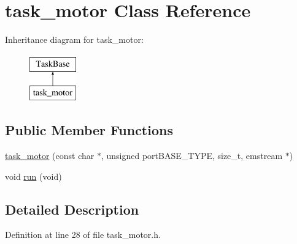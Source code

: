 \hypertarget{classtask__motor}{\section{task\-\_\-motor Class Reference}
\label{classtask__motor}
}
Inheritance diagram for task\-\_\-motor\-:\begin{figure}[H]
\begin{center}
\leavevmode
\includegraphics[height=2.000000cm]{classtask__motor}
\end{center}
\end{figure}
\subsection*{Public Member Functions}
\begin{DoxyCompactItemize}
\item 
\hyperlink{classtask__motor_a6ed0a0b463e698d636b28bcdd518a027}{task\-\_\-motor} (const char $\ast$, unsigned port\-B\-A\-S\-E\-\_\-\-T\-Y\-P\-E, size\-\_\-t, emstream $\ast$)
\item 
void \hyperlink{classtask__motor_a895a075ec470c9d5a07b8959de06aacd}{run} (void)
\end{DoxyCompactItemize}


\subsection{Detailed Description}


Definition at line 28 of file task\-\_\-motor.\-h.



